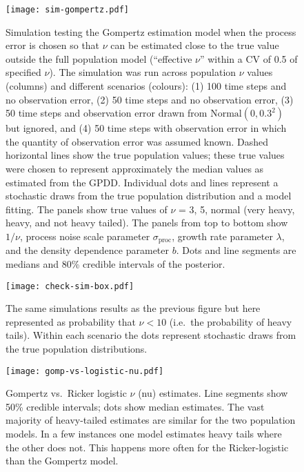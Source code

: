 \documentclass[11pt]{article}
\begin{document}
\begin{figure}[htbp]
\begin{center}
\texttt{[image: sim-gompertz.pdf]}
\caption{Simulation testing the Gompertz estimation model when the process error is chosen so that $\nu$ can be estimated close to the true value outside the full population model (``effective $\nu$'' within a CV of 0.5 of specified $\nu$).
  The simulation was run across population $\nu$ values (columns) and different scenarios (colours): (1) 100 time steps and no observation error, (2) 50 time steps and no observation error, (3) 50 time steps and observation error drawn from $\mathrm{Normal} (0, 0.3^2)$ but ignored, and (4) 50 time steps with observation error in which the quantity of observation error was assumed known.
  Dashed horizontal lines show the true population values;
  these true values were chosen to represent approximately the median values as estimated from the GPDD.
  Individual dots and lines represent a stochastic draws from the true population distribution and a model fitting.
  The panels show true values of $\nu$ =  3, 5, normal (very heavy, heavy, and not heavy tailed).
  The panels from top to bottom show $1/\nu$, process noise scale parameter $\sigma_\mathrm{proc}$, growth rate parameter $\lambda$, and the density dependence parameter $b$.
  Dots and line segments are medians and 80\% credible intervals of the posterior.}
\label{fig:sim-gompertz}
\end{center}
\end{figure}

\begin{figure}[htbp]
\begin{center}
\texttt{[image: check-sim-box.pdf]}
\caption{The same simulations results as the previous figure but here represented as probability that $\nu < 10$ (i.e.\ the probability of heavy tails). Within each scenario the dots represent stochastic draws from the true population distributions.}
\label{fig:sim-prob}
\end{center}
\end{figure}

\clearpage

\begin{figure}[htbp]
\begin{center}
\texttt{[image: gomp-vs-logistic-nu.pdf]}
\caption{Gompertz vs.\ Ricker logistic $\nu$ (nu) estimates. Line segments show 50\% credible intervals; dots show median estimates. The vast majority of heavy-tailed estimates are similar for the two population models. In a few instances one model estimates heavy tails where the other does not. This happens more often for the Ricker-logistic than the Gompertz model.}
\label{fig:gomp-vs-ricker}
\end{center}
\end{figure}
\end{document}
